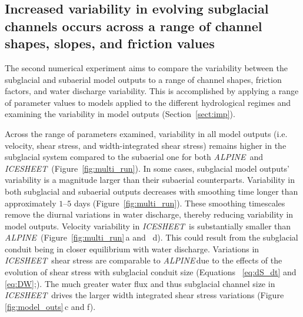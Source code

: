 \documentclass[tc, manuscript]{copernicus}
\newcommand{\alpine}{\textit{ALPINE}\,}
\newcommand{\icesheet}{\textit{ICESHEET}\,}
\begin{document}
\FloatBarrier
\subsection{Increased variability in evolving subglacial channels occurs across a range of channel shapes, slopes,  and friction values}
\label{sect:ensemble}

The second numerical experiment aims to compare the variability between the subglacial and subaerial model outputs to a range of channel shapes, friction factors, and water discharge variability. 
This is accomplished by applying a range of parameter values to models applied to the different hydrological regimes and examining the variability in model outputs (Section~\ref{sect:imp}).

Across the range of parameters examined, variability in all model outputs (i.e. velocity, shear stress, and width-integrated shear stress) remains higher in the subglacial system compared to the subaerial one for both \alpine{} and \icesheet{} (Figure~\ref{fig:multi_run}).
In some cases, subglacial model outputs' variability is a magnitude larger than their subaerial counterparts.
Variability in both subglacial and subaerial outputs decreases with smoothing time longer than approximately $1$--$5$ days (Figure~\ref{fig:multi_run}).
These smoothing timescales remove the diurnal variations in water discharge, thereby reducing variability in model outputs. 
Velocity variability in \icesheet{} is substantially smaller than \alpine{} (Figure~\ref{fig:multi_run}\,a and \, d).
This could result from the subglacial conduit being in closer equilibrium with water discharge.
Variations in \icesheet{} shear stress are comparable to \alpine due to the effects of the evolution of shear stress with subglacial conduit size (Equations ~\ref{eq:dS_dt} and \ref{eq:DW};). 
The much greater water flux and thus subglacial channel size in \icesheet{} drives the larger width integrated shear stress variations (Figure \ref{fig:model_outs}\,c and f).
\end{document}
